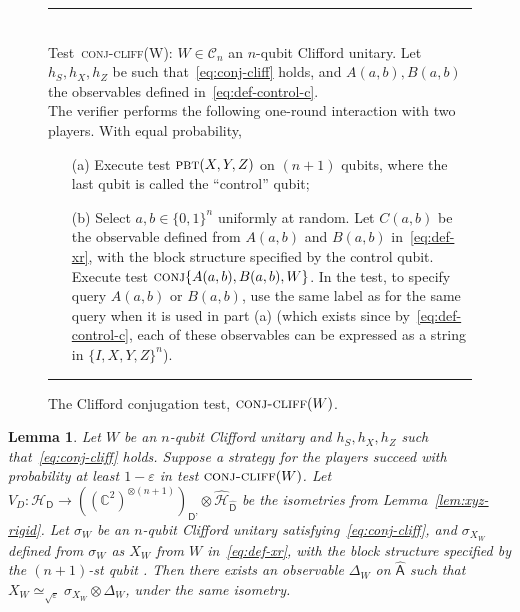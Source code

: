 \documentclass[11pt]{article}
\newtheorem{lemma}[theorem]{Lemma}
\theoremstyle{remark}
\theoremstyle{definition}
\newcommand{\reg}[1]{{\textsf{#1}}}
\newcommand{\C}{\ensuremath{\mathbb{C}}}
\newcommand{\mH}{\mathcal{H}}
\newcommand{\eps}{\varepsilon}
\newcommand{\pbt}{\textsc{pbt}}
\newcommand{\conj}{\textsc{conj}}
\newcommand{\perm}{\textsc{tens}}
\newcommand{\conjc}{\textsc{conj-cliff}}
\begin{document}
\begin{figure}[H]
\rule[1ex]{\textwidth}{0.5pt}\\
Test~\conjc(W): $W \in \mathcal{C}_n$ an $n$-qubit Clifford unitary. Let $h_S,h_X,h_Z$ be such that~\eqref{eq:conj-cliff} holds, and $A(a,b),B(a,b)$ the observables defined in~\eqref{eq:def-control-c}. \\
The verifier performs the following one-round interaction with two
players. With equal probability,
\begin{enumerate}
\item[(a)] Execute test $\pbt(X,Y,Z)$ on $(n+1)$ qubits, where the last qubit is called the ``control'' qubit;
\item[(b)] Select $a,b\in\{0,1\}^n$ uniformly at random. Let $C(a,b)$ be the observable defined from $A(a,b)$ and $B(a,b)$ in~\eqref{eq:def-xr}, with the block structure specified by the control qubit. Execute test $\conj\{A(a,b),B(a,b),W\}$. In the test, to specify query $A(a,b)$ or $B(a,b)$, use the same label as for the same query when it is used in part (a) (which exists since by~\eqref{eq:def-control-c}, each of these observables can be expressed as a string in $\{I,X,Y,Z\}^n$).
\end{enumerate}
\rule[2ex]{\textwidth}{0.5pt}\vspace{-1cm}
\caption{The Clifford conjugation test, $\conjc(W)$.}
\label{fig:conjugation-test-2}
\end{figure}


\begin{lemma}\label{lem:cliff-conj}
Let $W$ be an $n$-qubit Clifford unitary and $h_S,h_X,h_Z$ such that~\eqref{eq:conj-cliff} holds. Suppose a strategy for the players succeed with probability at least $1-\eps$ in test $\conjc(W)$. Let $V_D:\mH_\reg{D} \to ((\C^2)^{\otimes (n+1)})_{\reg{D'}}  \otimes \hat{\mH}_{\hat{\reg{D}}}$ be the isometries from Lemma~\ref{lem:xyz-rigid}.  Let $\sigma_W$ be an $n$-qubit Clifford unitary satisfying~\eqref{eq:conj-cliff}, and $\sigma_{X_W}$ defined from $\sigma_W$ as $X_W$ from $W$ in~\eqref{eq:def-xr}, with the block structure specified by the $(n+1)$-st qubit . Then there exists an observable $\Delta_W$ on $\hat{\reg{A}}$ such that $X_W \simeq_{\sqrt{\eps}} \sigma_{X_W}\otimes \Delta_W$, under the same isometry.  
\end{lemma}
\end{document}
